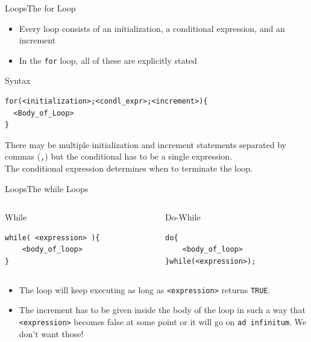 \documentclass{beamer}
\begin{document}
\begin{frame}[fragile]{Loops}{The for Loop}
\begin{itemize}
\item Every loop consists of an initialization, a conditional expression, and an increment
\item In the \verb|for| loop, all of these are explicitly stated
\end{itemize}
\begin{block}{Syntax}
\begin{verbatim}
for(<initialization>;<condl_expr>;<increment>){
  <Body_of_Loop>
}
\end{verbatim}
There may be multiple initialization and increment statements separated by commas (\verb|,|) but the conditional has to be a single expression.\\
The conditional expression determines when to terminate the loop.
\end{block}
\end{frame}

\begin{frame}[fragile]{Loops}{The while Loops}
\begin{columns}
\begin{column}{0.5\textwidth}
\begin{block}{While}
\begin{verbatim}
while( <expression> ){
    <body_of_loop>
}
\end{verbatim}
\end{block}
\end{column}

\begin{column}{0.5\textwidth}
\begin{block}{Do-While}
\begin{verbatim}
do{
    <body_of_loop>
}while(<expression>);
\end{verbatim}
\end{block}
\end{column}
\end{columns}

\begin{itemize}
\item The loop will keep executing as long as \verb|<expression>| returns \verb|TRUE|.
\item The increment has to be given inside the body of the loop in such a way that \verb|<expression>| becomes false at some point or it will go on \verb|ad infinitum|. We don't want those!
\end{itemize}
\end{frame}
\end{document}
